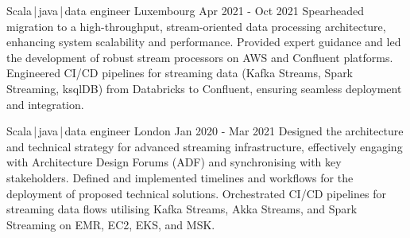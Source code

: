 \begin{cventries}

  \cventry
    {Scala\,|\,java\,|\,data engineer}
    {} %
    {Luxembourg} %
    {Apr 2021 - Oct 2021} %
    {
    Spearheaded migration to a high-throughput, stream-oriented data processing architecture, enhancing system scalability and performance. Provided expert guidance and led the development of robust stream processors on AWS and Confluent platforms. Engineered CI/CD pipelines for streaming data (Kafka Streams, Spark Streaming, ksqlDB) from Databricks to Confluent, ensuring seamless deployment and integration.
    }

  \cventry
    {Scala\,|\,java\,|\,data engineer}
    {} %
    {London} %
    {Jan 2020 - Mar 2021} %
    {
    Designed the architecture and technical strategy for advanced streaming infrastructure, effectively engaging with Architecture Design Forums (ADF) and synchronising with key stakeholders. Defined and implemented timelines and workflows for the deployment of proposed technical solutions. Orchestrated CI/CD pipelines for streaming data flows utilising Kafka Streams, Akka Streams, and Spark Streaming on EMR, EC2, EKS, and MSK.
    }

\end{cventries}



